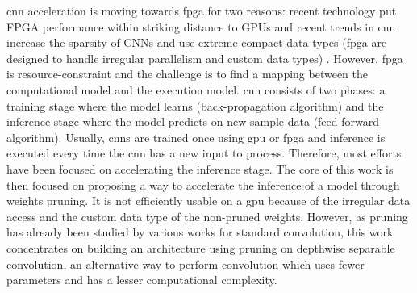 \acrshort{cnn} acceleration is moving towards \acrshort{fpga} for two reasons: recent technology put FPGA performance within striking distance to GPUs and recent trends in \acrshort{cnn} increase the sparsity of CNNs and use extreme compact data types (\acrshort{fpga} are designed to handle irregular parallelism and custom data types) \cite{abdelouahab_accelerating_2018}. However, \acrshort{fpga} is resource-constraint and the challenge is to find a mapping between the computational model and the execution model. \newline \newline
\acrshort{cnn} consists of two phases: a training stage where the model learns (back-propagation algorithm) and the inference stage where the model predicts on new sample data (feed-forward algorithm). Usually, \acrshort{cnn}s are trained once using \acrshort{gpu} or \acrshort{fpga} and inference is executed every time the \acrshort{cnn} has a new input to process. Therefore, most efforts have been focused on accelerating the inference stage. The core of this work is then focused on proposing a way to accelerate the inference of a model through weights pruning. It is not efficiently usable on a \acrshort{gpu} because of the irregular data access and the custom data type of the non-pruned weights. \newline \newline
However, as pruning has already been studied by various works for standard convolution, this work concentrates on building an architecture using pruning on depthwise separable convolution, an alternative way to perform convolution which uses fewer parameters and has a lesser computational complexity.
